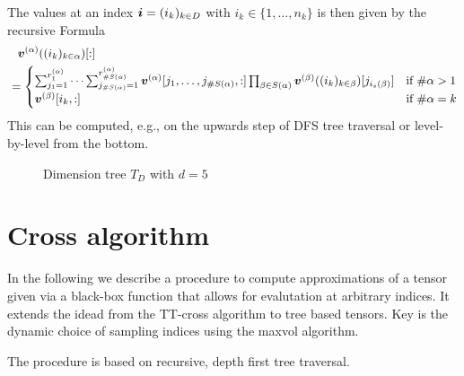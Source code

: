 \documentclass[a4wide]{article}
\begin{document}
The values at an index ${\boldsymbol{i}} = (i_k)_{k \in D}$ with $i_k \in \{1, \dots, n_k\}$
is then given by the recursive Formula
\begin{align*}
  &\phantom{=} {\boldsymbol{v}}^{(\alpha)}((i_k)_{k \in \alpha})[:] \\
  &= 
  \begin{cases}
    \sum_{j_1 = 1}^{r_{1}^{(\alpha)}} \dots \sum_{j_{\# S(\alpha)} = 1}^{r_{\# S(\alpha)}^{(\alpha)}} 
    {\boldsymbol{v}}^{(\alpha)}[j_1, \dots, j_{\# S(\alpha)}, :]
    \prod_{\beta \in S(\alpha)} {\boldsymbol{v}}^{(\beta)}((i_k)_{k \in \beta})[j_{i_s(\beta)}]
    & \text{if } \# \alpha > 1 \\
    {\boldsymbol{v}}^{(\beta)}[i_{k}, :]
    & \text{if } \# \alpha = {k} \\
  \end{cases}
\end{align*}
This can be computed, e.g., on the upwards step of DFS tree traversal or level-by-level from the bottom.

\begin{figure}[h!]
\centering
{}
\caption{Dimension tree $T_D$ with $d=5$}
\end{figure}


\section{Cross algorithm}

In the following we describe a procedure to compute approximations of a tensor given via a black-box function that allows for evalutation at arbitrary indices.
It extends the idead from the TT-cross algorithm to tree based tensors.
Key is the dynamic choice of sampling indices using the maxvol algorithm.

The procedure is based on recursive, depth first tree traversal.
\end{document}
